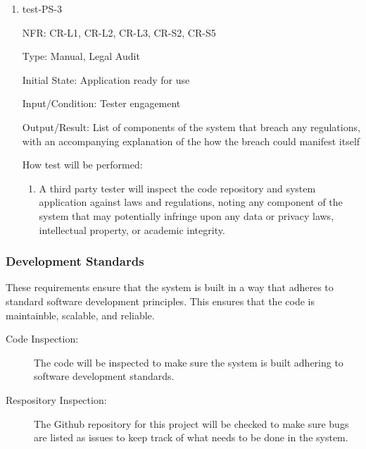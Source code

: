 \documentclass[12pt, titlepage]{article}
\begin{document}
\begin{enumerate}
  \item{test-PS-3}
  
  NFR: CR-L1, CR-L2, CR-L3, CR-S2, CR-S5

  Type: Manual, Legal Audit

  Initial State: Application ready for use

  Input/Condition: Tester engagement
  
  Output/Result: List of components of the system that breach any regulations, 
  with an accompanying explanation of the how the breach could manifest itself

  How test will be performed:
  \begin{enumerate}
    \item A third party tester will inspect the code repository and system 
    application against laws and regulations, noting any component of the system 
    that may potentially infringe upon any data or privacy laws, intellectual 
    property, or academic integrity.
  \end{enumerate}
\end{enumerate}

\subsubsection{Development Standards}
These requirements ensure that the system is built in a way that adheres to
standard software development principles. This ensures that the code is
maintainble, scalable, and reliable.

\begin{description}
  \item[Code Inspection:] The code will be inspected to make sure the system is
  built adhering to software development standards.
  \item[Respository Inspection:] The Github repository for this project will be
  checked to make sure bugs are listed as issues to keep track of what needs to
  be done in the system.
\end{description}
\end{document}
